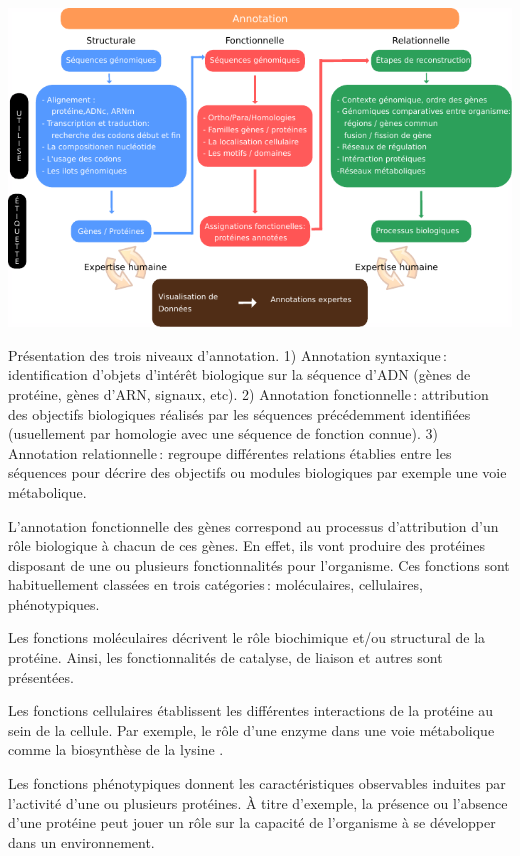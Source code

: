 \begin{refsegment}
    \begin{shadedfigure}[H]
        \centering
        \includegraphics[width=\textwidth]{img/niveaux_annotations.pdf}
        \caption{Présentation des trois niveaux d’annotation. 1) Annotation syntaxique : identification d'objets d’intérêt biologique sur la séquence d’ADN (gènes de protéine, gènes d’ARN, signaux, etc). 2) Annotation fonctionnelle : attribution des objectifs biologiques réalisés par les séquences précédemment identifiées (usuellement par homologie avec une séquence de fonction connue). 3) Annotation relationnelle : regroupe différentes relations établies entre les séquences pour décrire des objectifs ou modules biologiques par exemple une voie métabolique.  }
        \label{fig:niveaux_annotation}
    \end{shadedfigure}
    
    L’annotation fonctionnelle des gènes correspond au processus d’attribution d'un rôle biologique à chacun de ces gènes. En effet, ils vont produire des protéines disposant de une ou plusieurs fonctionnalités pour l’organisme. Ces fonctions sont habituellement classées en trois catégories : moléculaires, cellulaires, phénotypiques.
    
    Les fonctions moléculaires décrivent le rôle biochimique et/ou structural de la protéine. Ainsi, les fonctionnalités de catalyse, de liaison et autres sont présentées.
    
    Les fonctions cellulaires établissent les différentes interactions de la protéine au sein de la cellule. Par exemple, le rôle d’une enzyme dans une voie métabolique comme la biosynthèse de la lysine . 
    
    Les fonctions phénotypiques donnent les caractéristiques observables induites par l’activité d’une ou plusieurs protéines. À titre d’exemple, la présence ou l’absence d’une protéine peut jouer un rôle sur la capacité de l’organisme à se développer dans un environnement.
    

\end{refsegment}
